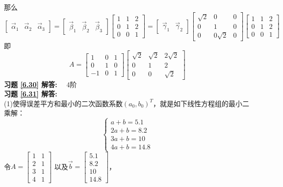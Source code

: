 \documentclass[a4paper]{book}
\begin{document}
那么
\begin{equation*}
\begin{bmatrix}\vec{\alpha}_1&\vec{\alpha}_2&\vec{\alpha}_3\end{bmatrix}=
\begin{bmatrix}\vec{\beta}_1&\vec{\beta}_2&\vec{\beta}_3\end{bmatrix}\begin{bmatrix}1&1&2\\0&1&2\\0&0&1\end{bmatrix}
=\begin{bmatrix}\vec{\gamma}_1&\vec{\gamma}_2\end{bmatrix}\begin{bmatrix}\sqrt{2}&0&0\\0&1&0\\0&0\sqrt{2}&0\end{bmatrix}
\begin{bmatrix}1&1&2\\0&1&2\\0&0&1\end{bmatrix}
\end{equation*}
即
\begin{equation*}
A=\begin{bmatrix}1&0&1\\0&1&0\\-1&0&1\end{bmatrix}
  \begin{bmatrix}\sqrt{2}&\sqrt{2}&2\sqrt{2}\\0&1&2\\0&0&\sqrt{2}\end{bmatrix}
\end{equation*}
\textbf{习题 \ref{6.30} 解答:}~~ 4阶\\
\textbf{习题 \ref{6.31} 解答:} \\
(1)使得误差平方和最小的二次函数系数$(a_0,b_0)^T$，就是如下线性方程组的最小二乘解：
\begin{equation*}
  \begin{cases}
  a+b=5.1\\
  2a+b=8.2\\
  3a+b=10\\
  4a+b=14.8
  \end{cases}
\end{equation*}
令$A=\begin{bmatrix}1&1\\2&1\\3&1\\4&1\end{bmatrix}$ 以及$\vec{b}=\begin{bmatrix}5.1\\8.2\\10\\14.8\end{bmatrix}$，
\end{document}
